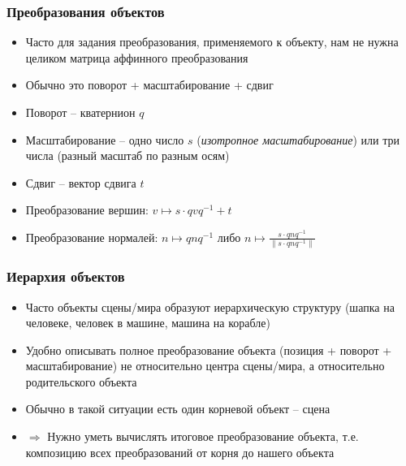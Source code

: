 \documentclass[10pt]{beamer}
\begin{document}
\begin{frame}[fragile]
\frametitle{Преобразования объектов}
\begin{itemize}
\item Часто для задания преобразования, применяемого к объекту, нам не нужна целиком матрица аффинного преобразования
\pause
\item Обычно это поворот + масштабирование + сдвиг
\pause
\item Поворот -- кватернион \begin{math}q\end{math}
\pause
\item Масштабирование -- одно число \begin{math}s\end{math} (\textit{изотропное масштабирование}) или три числа (разный масштаб по разным осям)
\pause
\item Сдвиг -- вектор сдвига \begin{math}t\end{math}
\pause
\item Преобразование вершин: \begin{math}v \mapsto s \cdot qvq^{-1} + t\end{math}
\pause
\item Преобразование нормалей: \begin{math}n \mapsto qnq^{-1}\end{math} либо \begin{math}n \mapsto \frac{s \cdot qnq^{-1}}{\|s \cdot qnq^{-1}\|}\end{math}
\end{itemize}
\end{frame}

\begin{frame}[fragile]
\frametitle{Иерархия объектов}
\begin{itemize}
\item Часто объекты сцены/мира образуют иерархическую структуру (шапка на человеке, человек в машине, машина на корабле)
\pause
\item Удобно описывать полное преобразование объекта (позиция + поворот + масштабирование) не относительно центра сцены/мира, а относительно родительского объекта
\pause
\item Обычно в такой ситуации есть один корневой объект -- сцена
\pause
\item \begin{math}\Longrightarrow\end{math} Нужно уметь вычислять итоговое преобразование объекта, т.е. композицию всех преобразований от корня до нашего объекта
\end{itemize}
\end{frame}
\end{document}
